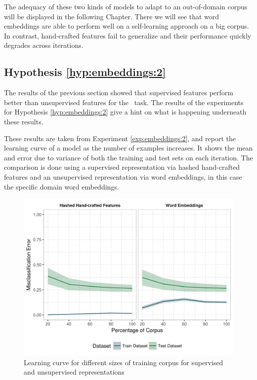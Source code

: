 The adequacy of these two kinds of models to adapt to an out-of-domain corpus
will be displayed in the following Chapter. There we will see that word
embeddings are able to perform well on a self-learning approach on a big
corpus. In contrast, hand-crafted features fail to generalize and their
performance quickly degrades across iterations.

\subsection{Hypothesis \ref{hyp:embeddings:2}}\label{sec:embeddings:hyp:2}

The results of the previous section showed that supervised features perform
better than unsupervised features for the \vsd~task. The results of the
experiments for Hypothesis \ref{hyp:embeddings:2} give a hint on what is
happening underneath these results.

These results are taken from Experiment \ref{exp:embeddings:2}, and report the
learning curve of a model as the number of examples increases. It shows the
mean and error due to variance of both the training and test sets on each
iteration. The comparison is done using a supervised representation via hashed
hand-crafted features and an unsupervised representation via word embeddings,
in this case the specific domain word embeddings.

\begin{figure}[ht]
	\includegraphics[width=\textwidth]{plots/embeddings/learning_curve_scores}
  \caption{Learning curve for different sizes of training corpus for supervised
  and unsupervised representations}
  \label{fig:embeddings:learning_curve}
\end{figure}

